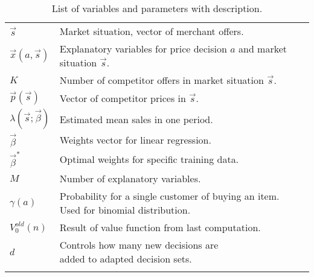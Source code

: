 \begin{longtable}{ll}
		\midrule
		$\vec{s}$ & Market situation, vector of merchant offers. \\
		$\vec{x}(a, \vec{s})$ & \makecell[l]{Explanatory variables for price decision $a$ \\ and market situation $\vec{s}$.} \\
		$K$ & Number of competitor offers in market situation $\vec{s}$. \\
		$\vec{p}(\vec{s})$ & Vector of competitor prices in $\vec{s}$. \\
		$\lambda(\vec{s}; \vec{\beta})$ & Estimated mean sales in one period. \\
		$\vec{\beta}$ & Weights vector for linear regression. \\
		$\vec{\beta}^*$ & Optimal weights for specific training data. \\
		$M$ & Number of explanatory variables. \\
		$\gamma(a)$ & \makecell[l]{Probability for a single customer of buying an item. \\ Used for binomial distribution.} \\
		
		\midrule
		$V_0^{old}(n)$ & Result of value function from last computation. \\
		$d$ & \makecell[l]{Controls how many new decisions are \\ added to adapted decision sets.} \\
		\bottomrule
	\caption[List of Variables and Parameters]{List of variables and parameters with description.}
	\label{tab:notations}
\end{longtable}
